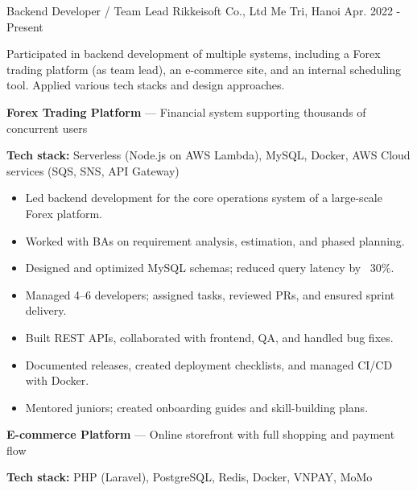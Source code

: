 \begin{cventries}
  \cventry
    {Backend Developer / Team Lead} %
    {Rikkeisoft Co., Ltd} %
    {Me Tri, Hanoi} %
    {Apr. 2022 - Present} %
    {
      \begin{cvitems} %
        \item {Participated in backend development of multiple systems, including a Forex trading platform (as team lead), an e-commerce site, and an internal scheduling tool. Applied various tech stacks and design approaches.}
        \vspace{0.5em}
        \item[] \textbf{Forex Trading Platform} — Financial system supporting thousands of concurrent users
        \vspace{0.15em}
        \item[] \textbf{Tech stack:} Serverless (Node.js on AWS Lambda), MySQL, Docker, AWS Cloud services (SQS, SNS, API Gateway)
        \vspace{0.25em}
        \begin{itemize}[label=•,itemsep=0.15em]
          \item {Led backend development for the core operations system of a large-scale Forex platform.}
          \item {Worked with BAs on requirement analysis, estimation, and phased planning.}
          \item {Designed and optimized MySQL schemas; reduced query latency by ~30\%.}
          \item {Managed 4–6 developers; assigned tasks, reviewed PRs, and ensured sprint delivery.}
          \item {Built REST APIs, collaborated with frontend, QA, and handled bug fixes.}
          \item {Documented releases, created deployment checklists, and managed CI/CD with Docker.}
          \item {Mentored juniors; created onboarding guides and skill-building plans.}
        \end{itemize}
        \vspace{0.5em}
        \item[] \textbf{E-commerce Platform} — Online storefront with full shopping and payment flow
        \vspace{0.15em}
        \item[] \textbf{Tech stack:} PHP (Laravel), PostgreSQL, Redis, Docker, VNPAY, MoMo
        \vspace{0.25em}

\end{cvitems}}
\end{cventries}
